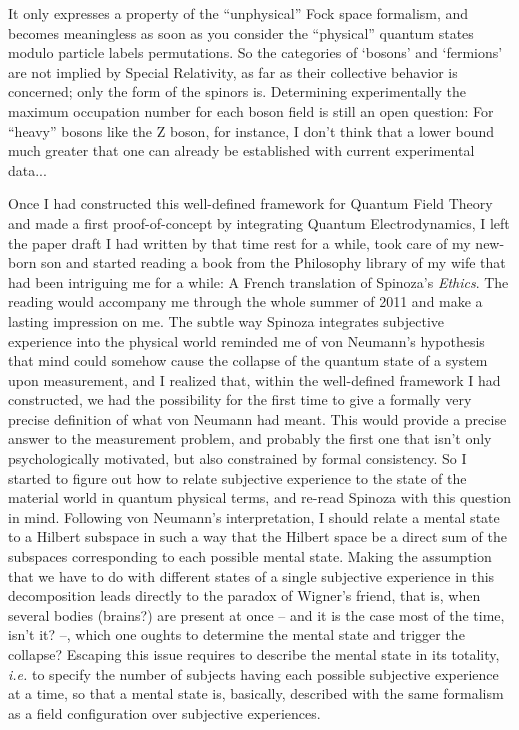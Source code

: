 It only expresses a property of the ``unphysical'' Fock space formalism, and becomes meaningless as soon as you consider the ``physical'' quantum states modulo particle labels permutations.
So the categories of `bosons' and `fermions' are not implied by Special Relativity, as far as their collective behavior is concerned; only the form of the spinors is.
Determining experimentally the maximum occupation number for each boson field is still an open question: For ``heavy'' bosons like the Z boson, for instance, I don't think that a lower bound much greater that one can already be established with current experimental data...

Once I had constructed this well-defined framework for Quantum Field Theory and made a first proof-of-concept by integrating Quantum Electrodynamics, I left the paper draft I had written by that time rest for a while, took care of my new-born son and started reading a book from the Philosophy library of my wife that had been intriguing me for a while: A French translation of Spinoza's \textit{Ethics}.
The reading would accompany me through the whole summer of 2011 and make a lasting impression on me.
The subtle way Spinoza integrates subjective experience into the physical world reminded me of von Neumann's hypothesis that mind could somehow cause the collapse of the quantum state of a system upon measurement, and I realized that, within the well-defined framework I had constructed, we had the possibility for the first time to give a formally very precise definition of what von Neumann had meant.
This would provide a precise answer to the measurement problem, and probably the first one that isn't only psychologically motivated, but also constrained by formal consistency.
So I started to figure out how to relate subjective experience to the state of the material world in quantum physical terms, and re-read Spinoza with this question in mind.
Following von Neumann's interpretation, I should relate a mental state to a Hilbert subspace in such a way that the Hilbert space be a direct sum of the subspaces corresponding to each possible mental state.
Making the assumption that we have to do with different states of a single subjective experience in this decomposition leads directly to the paradox of Wigner's friend, that is, when several bodies (brains?) are present at once -- and it is the case most of the time, isn't it? --, which one oughts to determine the mental state and trigger the collapse? Escaping this issue requires to describe the mental state in its totality, \textit{i.e.} to specify the number of subjects having each possible subjective experience at a time, so that a mental state is, basically, described with the same formalism as a field configuration over subjective experiences.
